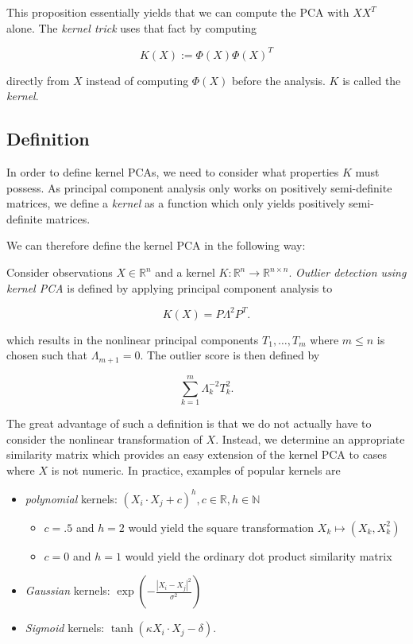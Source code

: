 \documentclass[]{report}
\providecommand{\tightlist}{%
  \setlength{\itemsep}{0pt}\setlength{\parskip}{0pt}}
\theoremstyle{definition}
\theoremstyle{definition}
\theoremstyle{definition}
\theoremstyle{remark}
\let\BeginKnitrBlock\begin \let\EndKnitrBlock\end
\begin{document}
This proposition essentially yields that we can compute the PCA with
\(XX^T\) alone. The \emph{kernel trick} uses that fact by computing

\[
K(X):=\Phi(X)\Phi(X)^T
\]

directly from \(X\) instead of computing \(\Phi(X)\) before the
analysis. \(K\) is called the \emph{kernel}.

\hypertarget{definition-1}{%
\subsection{Definition}\label{definition-1}}

In order to define kernel PCAs, we need to consider what properties
\(K\) must possess. As principal component analysis only works on
positively semi-definite matrices, we define a \emph{kernel} as a
function which only yields positively semi-definite matrices.

We can therefore define the kernel PCA in the following way:

\BeginKnitrBlock{definition}
\protect\hypertarget{def:unnamed-chunk-9}{}{\label{def:unnamed-chunk-9}
}Consider observations \(X\in\mathbb{R}^n\) and a kernel
\(K:\mathbb{R}^n\to\mathbb{R}^{n\times n}\). \emph{Outlier detection
using kernel PCA} is defined by applying principal component analysis to

\[
  K(X)=P\Lambda^2P^T.
\]

which results in the nonlinear principal components \(T_1,\dotsc,T_m\)
where \(m\le n\) is chosen such that \(\Lambda_{m+1}=0\). The outlier
score is then defined by

\[
  \sum_{k=1}^m\Lambda_{k}^{-2}T_k^2.
\]
\EndKnitrBlock{definition}

The great advantage of such a definition is that we do not actually have
to consider the nonlinear transformation of \(X\). Instead, we determine
an appropriate similarity matrix which provides an easy extension of the
kernel PCA to cases where \(X\) is not numeric. In practice, examples of
popular kernels are

\begin{itemize}
\tightlist
\item
  \emph{polynomial} kernels:
  \((X_i\cdot X_j+c)^h, c\in\mathbb{R},h\in \mathbb{N}\)

  \begin{itemize}
  \tightlist
  \item
    \(c=.5\) and \(h=2\) would yield the square transformation
    \(X_k\mapsto (X_k, X_k^2)\)
  \item
    \(c=0\) and \(h=1\) would yield the ordinary dot product similarity
    matrix
  \end{itemize}
\item
  \emph{Gaussian} kernels:
  \(\exp\left(-\frac{|X_i-X_j|^2}{\sigma^2}\right)\)
\item
  \emph{Sigmoid} kernels:
  \(\tanh\left(\kappa X_i\cdot X_j-\delta\right)\).
\end{itemize}
\end{document}
